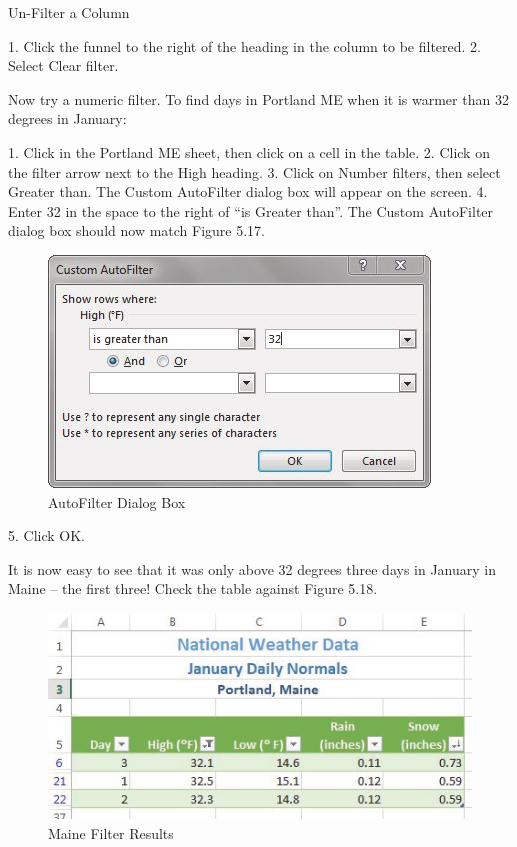 Un-Filter a Column

1. Click the funnel to the right of the heading in the column to be filtered.
2. Select Clear filter.

Now try a numeric filter. To find days in Portland ME when it is warmer than 32 degrees in January:

1. Click in the Portland ME sheet, then click on a cell in the table.
2. Click on the filter arrow next to the High heading.
3. Click on Number filters, then select Greater than. The Custom AutoFilter dialog box will appear
on the screen.
4. Enter 32 in the space to the right of ``is Greater than''. The Custom AutoFilter dialog box should now match Figure 5.17.


\begin{figure}[H]
	\centering
	\includegraphics[width=\maxwidth{.95\linewidth}]{gfx/ch05_fig17}
	\caption{AutoFilter Dialog Box}
	\label{05:fig17}
\end{figure}

5. Click OK.

It is now easy to see that it was only above 32 degrees three days in January in Maine – the first three! Check the table against Figure 5.18.

\begin{figure}[H]
	\centering
	\includegraphics[width=\maxwidth{.95\linewidth}]{gfx/ch05_fig18}
	\caption{Maine Filter Results}
	\label{05:fig18}
\end{figure}




